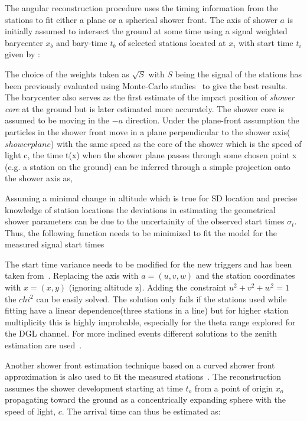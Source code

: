 The angular reconstruction procedure uses the timing information from the stations to fit either a plane or a spherical shower front. The axis of shower $a$ is initially assumed to intersect the ground at some time using a signal weighted barycenter $x_b$ and bary-time $t_b$ of selected stations located at $x_i$ with start time $t_i$ given by :




The choice of the weights taken as $\sqrt{S} $ with $S$ being the signal of the stations has been previously evaluated using Monte-Carlo studies~\cite{} to give the best results. The barycenter also serves as the first estimate of the impact position of \textit{shower core} at the ground but is later estimated more accurately. The shower core is assumed to be moving in the $-a$ direction. Under the plane-front assumption the particles in the shower front move in a plane perpendicular to the shower axis($shower plane$) with the same speed as the core of the shower which is the speed of light c, the time t(x) when the shower plane passes through some chosen point
x (e.g. a station on the ground) can be inferred through a simple projection onto the shower axis as,


Assuming a minimal change in altitude which is true for SD location and precise knowledge of station locations the deviations in estimating the geometrical shower parameters can be due to the uncertainity of the observed start times $\sigma_t$. Thus, the following function needs to be minimized to fit the model for the measured signal start times 


The start time variance needs to be modified for the new triggers and has been taken from~\cite{}. Replacing the axis with $a =(u,v,w)$ and the station coordinates with $x = (x,y)$ (ignoring altitude z). Adding the constraint $u^2 + v^2 + w^2 = 1$ the $chi^2$ can be easily solved. The solution only fails if the stations used while fitting have a linear dependence(three stations in a line) but for higher station multiplicity this is highly improbable, especially for the theta range explored for the DGL channel. For more inclined events different solutions to the zenith estimation are used~\cite{}. 
 
Another shower front estimation technique based on a curved shower front approximation is also used to fit the measured stations~\cite{}. The reconstruction assumes the shower development starting at time $t_o$ from a point of origin $x_o$ propagating toward the ground as a concentrically expanding sphere with the speed of light, $c$. The arrival time can thus be estimated as:


